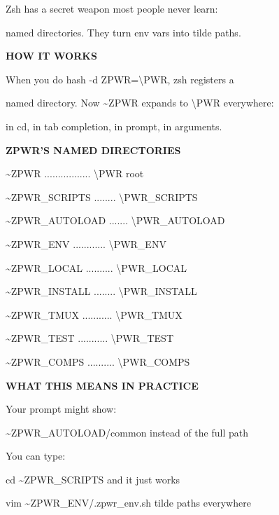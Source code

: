\documentclass[11pt,a4paper,twoside]{book}
\begin{document}
Zsh has a secret weapon most people never learn:

named directories. They turn env vars into tilde paths.


\vspace{12pt}
{\bfseries\color{neonyellow} HOW IT WORKS}\vspace{4pt}

When you do hash -d ZPWR=\textbackslash{}PWR, zsh registers a

named directory. Now \textasciitilde{}ZPWR expands to \textbackslash{}PWR everywhere:

in cd, in tab completion, in prompt, in arguments.


\vspace{12pt}
{\bfseries\color{neonyellow} ZPWR'S NAMED DIRECTORIES}\vspace{4pt}

\textasciitilde{}ZPWR ................. \textbackslash{}PWR root

\textasciitilde{}ZPWR\_SCRIPTS ........ \textbackslash{}PWR\_SCRIPTS

\textasciitilde{}ZPWR\_AUTOLOAD ....... \textbackslash{}PWR\_AUTOLOAD

\textasciitilde{}ZPWR\_ENV ............ \textbackslash{}PWR\_ENV

\textasciitilde{}ZPWR\_LOCAL .......... \textbackslash{}PWR\_LOCAL

\textasciitilde{}ZPWR\_INSTALL ........ \textbackslash{}PWR\_INSTALL

\textasciitilde{}ZPWR\_TMUX ........... \textbackslash{}PWR\_TMUX

\textasciitilde{}ZPWR\_TEST ........... \textbackslash{}PWR\_TEST

\textasciitilde{}ZPWR\_COMPS .......... \textbackslash{}PWR\_COMPS


\vspace{12pt}
{\bfseries\color{neonyellow} WHAT THIS MEANS IN PRACTICE}\vspace{4pt}

Your prompt might show:

\textasciitilde{}ZPWR\_AUTOLOAD/common  instead of the full path

You can type:

cd \textasciitilde{}ZPWR\_SCRIPTS  and it just works

\begin{codebox}
vim \textasciitilde{}ZPWR\_ENV/.zpwr\_env.sh  tilde paths everywhere\\
\end{codebox}
\end{document}
